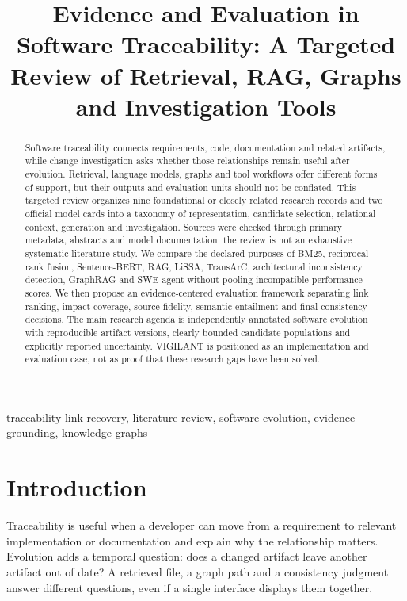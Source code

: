 \documentclass[conference,a4paper]{IEEEtran}
\begin{document}
\title{Evidence and Evaluation in Software Traceability: A Targeted Review of Retrieval, RAG, Graphs and Investigation Tools}
\author{}
\maketitle
\begin{abstract}
Software traceability connects requirements, code, documentation and related artifacts, while change investigation asks whether those relationships remain useful after evolution. Retrieval, language models, graphs and tool workflows offer different forms of support, but their outputs and evaluation units should not be conflated. This targeted review organizes nine foundational or closely related research records and two official model cards into a taxonomy of representation, candidate selection, relational context, generation and investigation. Sources were checked through primary metadata, abstracts and model documentation; the review is not an exhaustive systematic literature study. We compare the declared purposes of BM25, reciprocal rank fusion, Sentence-BERT, RAG, LiSSA, TransArC, architectural inconsistency detection, GraphRAG and SWE-agent without pooling incompatible performance scores. We then propose an evidence-centered evaluation framework separating link ranking, impact coverage, source fidelity, semantic entailment and final consistency decisions. The main research agenda is independently annotated software evolution with reproducible artifact versions, clearly bounded candidate populations and explicitly reported uncertainty. VIGILANT is positioned as an implementation and evaluation case, not as proof that these research gaps have been solved.
\end{abstract}
\begin{IEEEkeywords}traceability link recovery, literature review, software evolution, evidence grounding, knowledge graphs\end{IEEEkeywords}

\section{Introduction}
Traceability is useful when a developer can move from a requirement to relevant implementation or documentation and explain why the relationship matters. Evolution adds a temporal question: does a changed artifact leave another artifact out of date? A retrieved file, a graph path and a consistency judgment answer different questions, even if a single interface displays them together.
\end{document}
